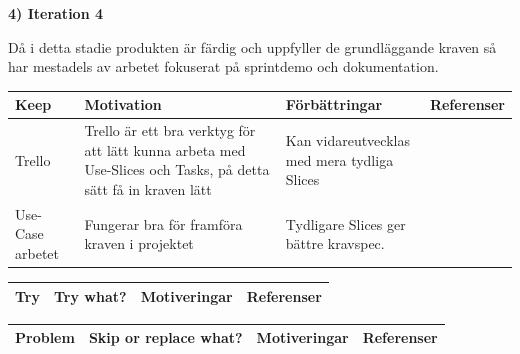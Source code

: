 \documentclass[conference,a4paper]{IEEEtran}
\newcommand\Tstrut{\rule{0pt}{2.6ex}}       %
\newcommand\Bstrut{\rule[-0.9ex]{0pt}{0pt}} %
\newcommand{\TBstrut}{\Tstrut\Bstrut} %
\begin{document}
\textbf{4) Iteration 4}

Då i detta stadie produkten är färdig och uppfyller de grundläggande kraven så har mestadels av arbetet fokuserat på sprintdemo och dokumentation.

\begin{table}[H]
	\small
  \centering
	\begin{tabular}{|p{1.5cm}|p{2cm}|p{1.8cm}|p{1.5cm}|} %
    \hline
    Keep & Motivation & Förbättringar & Referenser \TBstrut \\
    \hline
     Trello & Trello är ett bra verktyg för att lätt kunna arbeta med Use-Slices och Tasks, på detta sätt få in kraven lätt & Kan vidareutvecklas med mera tydliga Slices & \cite{Jacobson11} \TBstrut \\
    \hline
    Use-Case arbetet & Fungerar bra för framföra kraven i projektet & Tydligare Slices ger bättre kravspec. &\cite{Jacobson11} \TBstrut \\
    \hline
  \end{tabular}
\end{table}

\begin{table}[H]
	\small
  \centering
	\begin{tabular}{|p{1.5cm}|p{2cm}|p{1.8cm}|p{1.5cm}|} %
    \hline
    Try & Try what? & Motiveringar & Referenser \TBstrut \\
    \hline

  \end{tabular}
\end{table}

\begin{table}[H]
	\small
  \centering
	\begin{tabular}{|p{1.5cm}|p{2cm}|p{1.8cm}|p{1.5cm}|} %
    \hline
    Problem & Skip or replace what? & Motiveringar & Referenser \TBstrut \\
    \hline


  \end{tabular}
\end{table}
\end{document}
